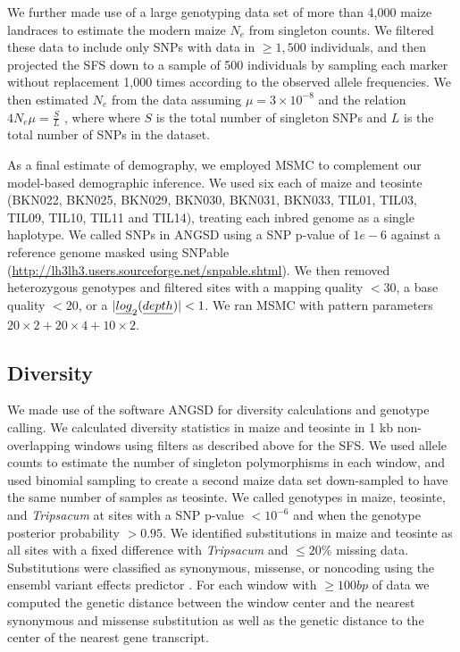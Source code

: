 \documentclass{pnastwo}
\begin{document}
\begin{article}
\begin{materials}
We further made use of a large genotyping data set of more than 4,000 maize landraces \cite{Hearne2015} to estimate the modern maize $N_e$ from singleton counts.
We filtered these data to include only SNPs with data in $\geq 1,500$ individuals, and then projected the SFS down to a sample of 500 individuals by sampling each marker without replacement 1,000 times according to the observed allele frequencies.
We then estimated $N_e$ from the data assuming $\mu = 3 \times 10^{-8}$ \cite{clark2005} and the relation  $4N_e\mu = \frac{S}{L}$ \cite{fu1993}, where where $S$ is the total number of singleton SNPs and $L$ is the total number of SNPs in the dataset.

As a final estimate of demography, we employed MSMC \cite{schiffels2014}  to complement our model-based demographic inference. 
We used six each of maize and teosinte (BKN022, BKN025, BKN029, BKN030, BKN031, BKN033, TIL01, TIL03, TIL09, TIL10, TIL11 and TIL14), treating each inbred genome as a single haplotype.
We called SNPs in ANGSD \cite{korneliussen2014} using a SNP p-value of $1e-6$ against a reference genome masked using SNPable (\url{http://lh3lh3.users.sourceforge.net/snpable.shtml}).
We then removed heterozygous genotypes and filtered sites with a mapping quality $<30$, a base quality $<20$, or a $|\emph{log}_2(\emph{depth})|<1$.
We ran MSMC with pattern parameters $20\times2+20\times4+10\times2$.

\subsection{Diversity}
We made use of the software ANGSD \cite{korneliussen2014} for diversity calculations and genotype calling. 
We calculated diversity statistics in maize and teosinte in 1 kb non-overlapping windows using filters as described above for the SFS. 
We used allele counts to estimate the number of singleton polymorphisms in each window, and used binomial sampling to create a second maize data set down-sampled to have the same number of samples as teosinte.
We called genotypes in maize, teosinte, and \emph{Tripsacum} at sites with a SNP p-value $<10^{-6}$ and when the genotype posterior probability $>0.95$.
We identified substitutions in maize and teosinte as all sites with a fixed difference with \emph{Tripsacum} and $\leq 20\%$ missing data. 
Substitutions were classified as synonymous, missense, or noncoding using the ensembl variant effects predictor \cite{mclaren2010}.
For each window with $\geq 100bp$ of data we computed the genetic distance between the window center and the nearest synonymous and missense substitution as well as the genetic distance to the center of the nearest gene transcript.  


\end{materials}
\end{article}
\end{document}

